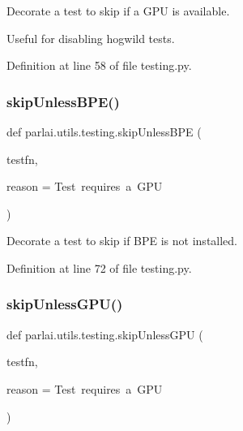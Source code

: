 \begin{DoxyVerb}Decorate a test to skip if a GPU is available.

Useful for disabling hogwild tests.
\end{DoxyVerb}
 

Definition at line 58 of file testing.\+py.

\mbox{\label{namespaceparlai_1_1utils_1_1testing_ab04af7a525a569f29b936b54b32899b7}} 
\subsubsection{\texorpdfstring{skip\+Unless\+B\+P\+E()}{skipUnlessBPE()}}
{\footnotesize\ttfamily def parlai.\+utils.\+testing.\+skip\+Unless\+B\+PE (\begin{DoxyParamCaption}\item[{}]{testfn,  }\item[{}]{reason = {\ttfamily \textquotesingle{}Test~requires~a~GPU\textquotesingle{}} }\end{DoxyParamCaption})}

\begin{DoxyVerb}Decorate a test to skip if BPE is not installed.\end{DoxyVerb}
 

Definition at line 72 of file testing.\+py.

\mbox{\label{namespaceparlai_1_1utils_1_1testing_a2773d8b6d4631fa1f639dde415eb3e2b}} 
\subsubsection{\texorpdfstring{skip\+Unless\+G\+P\+U()}{skipUnlessGPU()}}
{\footnotesize\ttfamily def parlai.\+utils.\+testing.\+skip\+Unless\+G\+PU (\begin{DoxyParamCaption}\item[{}]{testfn,  }\item[{}]{reason = {\ttfamily \textquotesingle{}Test~requires~a~GPU\textquotesingle{}} }\end{DoxyParamCaption})}

